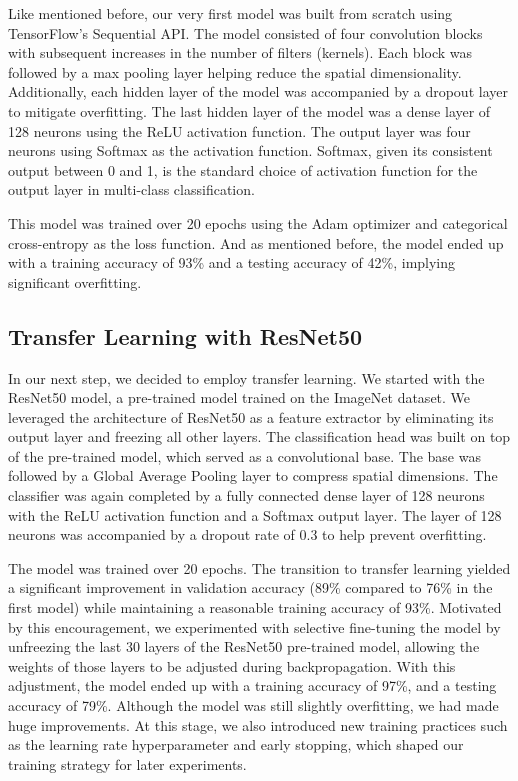 \documentclass[conference]{IEEEtran}
\begin{document}
Like mentioned before, our very first model was built from scratch using TensorFlow's Sequential API. The model consisted of four convolution blocks with subsequent increases in the number of filters (kernels). Each block was followed by a max pooling layer helping reduce the spatial dimensionality. Additionally, each hidden layer of the model was accompanied by a dropout layer to mitigate overfitting. The last hidden layer of the model was a dense layer of 128 neurons using the ReLU activation function. The output layer was four neurons using Softmax as the activation function. Softmax, given its consistent output between 0 and 1, is the standard choice of activation function for the output layer in multi-class classification. 

This model was trained over 20 epochs using the Adam optimizer and categorical cross-entropy as the loss function. And as mentioned before, the model ended up with a training accuracy of 93\% and a testing accuracy of 42\%, implying significant overfitting.

\subsection{\large Transfer Learning with ResNet50}

In our next step, we decided to employ transfer learning. We started with the ResNet50 model, a pre-trained model trained on the ImageNet dataset. We leveraged the architecture of ResNet50 as a feature extractor by eliminating its output layer and freezing all other layers. The classification head was built on top of the pre-trained model, which served as a convolutional base. The base was followed by a Global Average Pooling layer to compress spatial dimensions. The classifier was again completed by a fully connected dense layer of 128 neurons with the ReLU activation function and a Softmax output layer. The layer of 128 neurons was accompanied by a dropout rate of 0.3 to help prevent overfitting.

The model was trained over 20 epochs. The transition to transfer learning yielded a significant improvement in validation accuracy (89\% compared to 76\% in the first model) while maintaining a reasonable training accuracy of 93\%. Motivated by this encouragement, we experimented with selective fine-tuning the model by unfreezing the last 30 layers of the ResNet50 pre-trained model, allowing the weights of those layers to be adjusted during backpropagation. With this adjustment, the model ended up with a training accuracy of 97\%, and a testing accuracy of 79\%. Although the model was still slightly overfitting, we had made huge improvements. At this stage, we also introduced new training practices such as the learning rate hyperparameter and early stopping, which shaped our training strategy for later experiments.
\end{document}
